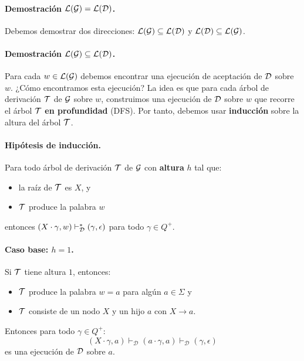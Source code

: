 \paragraph*{Demostración $\mathcal{L}(\mathcal{G}) = \mathcal{L}(\mathcal{D})$.} Debemos demostrar dos direcciones: $\mathcal{L}(\mathcal{G}) \subseteq \mathcal{L}(\mathcal{D})$ y $\mathcal{L}(\mathcal{D}) \subseteq \mathcal{L}(\mathcal{G})$.

\paragraph*{Demostración $\mathcal{L}(\mathcal{G}) \subseteq \mathcal{L}(\mathcal{D})$.} Para cada $w \in \mathcal{L}(\mathcal{G})$ debemos encontrar una ejecución de aceptación de $\mathcal{D}$ sobre $w$. ¿Cómo encontramos esta ejecución? La idea es que para cada árbol de derivación $\mathcal{T}$ de $\mathcal{G}$ sobre $w$, construimos una ejecución de $\mathcal{D}$ sobre $w$ que recorre el árbol $\mathcal{T}$ \textbf{en profundidad} (DFS). Por tanto, debemos usar \textbf{inducción} sobre la altura del árbol $\mathcal{T}$.

\paragraph*{Hipótesis de inducción.} Para todo árbol de derivación $\mathcal{T}$ de $\mathcal{G}$ con \textbf{altura} $h$ tal que:
\begin{itemize}
    \item la raíz de $\mathcal{T}$ es $X$, y
    \item $\mathcal{T}$ produce la palabra $w$
\end{itemize}
entonces $(X\cdot\gamma, w) \vdash_{\mathcal{D}}^* (\gamma, \epsilon)$ para todo $\gamma \in Q^+$.

\paragraph{Caso base: $h=1$.} Si $\mathcal{T}$ tiene altura $1$, entonces:
\begin{itemize}
    \item $\mathcal{T}$ produce la palabra $w=a$ para algún $a\in \Sigma$ y
    \item $\mathcal{T}$ consiste de un nodo $X$ y un hijo $a$ con $X \to a$.
\end{itemize}
Entonces para todo $\gamma \in Q^+$:
$$
    (X \cdot \gamma, a) \vdash_\mathcal{D} (a \cdot \gamma, a) \vdash_\mathcal{D}(\gamma, \epsilon)
$$
es una ejecución de $\mathcal{D}$ sobre $a$.

